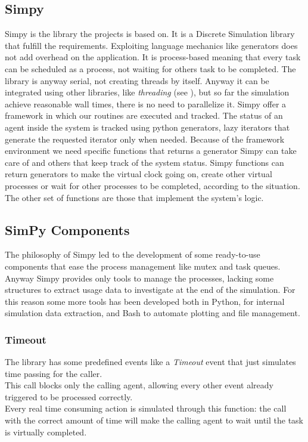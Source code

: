 \subsection{Simpy}
Simpy is the library the projects is based on. It is a Discrete Simulation
library that fulfill the requirements. Exploiting language mechanics like
generators does not add overhead on the application. It is process-based
meaning that every task can be scheduled as a process, not waiting for others
task to be completed. The library is anyway serial, not creating threads by
itself. Anyway it can be integrated using other libraries, like \textit{threading} (see
\cite{threading}), but so far the simulation achieve reasonable wall times,
there is no need to parallelize it.
Simpy offer a framework in which our routines are executed and tracked. The
status of an agent inside the system is tracked using python generators,
lazy iterators that generate the requested iterator only when needed. Because of
the framework environment we need specific functions that returns a generator
Simpy can take care of and others that keep track of the system status. Simpy
functions can return generators to make the virtual clock going on, create other
virtual processes or wait for other processes to be completed, according to the
situation. The other set of functions are those that implement the system's logic.

\subsection{SimPy Components}
The philosophy of Simpy led to the development of some ready-to-use components
that ease the process management like mutex and task queues.
Anyway Simpy provides only tools to manage the processes, lacking some
structures to extract usage data to investigate at the end of the simulation.
For this reason some more tools has been developed both in Python, for internal
simulation data extraction, and Bash to automate plotting and file management.

\subsubsection*{Timeout}
The library has some predefined events like a \textit{Timeout} event that just
simulates time passing for the caller.\\
This call blocks only the calling agent, allowing every other event already
triggered to be processed correctly. \\
Every real time consuming action is simulated through this function: the call
with the correct amount of time will make the calling agent to wait until the
task is virtually completed.

